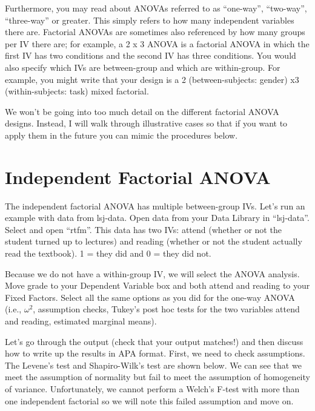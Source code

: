 \documentclass[
]{book}
\begin{document}
Furthermore, you may read about ANOVAs referred to as ``one-way'', ``two-way'', ``three-way'' or greater. This simply refers to how many independent variables there are. Factorial ANOVAs are sometimes also referenced by how many groups per IV there are; for example, a 2 x 3 ANOVA is a factorial ANOVA in which the first IV has two conditions and the second IV has three conditions. You would also specify which IVs are between-group and which are within-group. For example, you might write that your design is a 2 (between-subjects: gender) x3 (within-subjects: task) mixed factorial.

We won't be going into too much detail on the different factorial ANOVA designs. Instead, I will walk through illustrative cases so that if you want to apply them in the future you can mimic the procedures below.

\hypertarget{independent-factorial-anova}{%
\section{Independent Factorial ANOVA}\label{independent-factorial-anova}}

The independent factorial ANOVA has multiple between-group IVs. Let's run an example with data from lsj-data. Open data from your Data Library in ``lsj-data''. Select and open ``rtfm''. This data has two IVs: attend (whether or not the student turned up to lectures) and reading (whether or not the student actually read the textbook). 1 = they did and 0 = they did not.

Because we do not have a within-group IV, we will select the ANOVA analysis. Move grade to your Dependent Variable box and both attend and reading to your Fixed Factors. Select all the same options as you did for the one-way ANOVA (i.e., \(\omega^2\), assumption checks, Tukey's post hoc tests for the two variables attend and reading, estimated marginal means).

Let's go through the output (check that your output matches!) and then discuss how to write up the results in APA format. First, we need to check assumptions. The Levene's test and Shapiro-Wilk's test are shown below. We can see that we meet the assumption of normality but fail to meet the assumption of homogeneity of variance. Unfortunately, we cannot perform a Welch's F-test with more than one independent factorial so we will note this failed assumption and move on.
\end{document}
